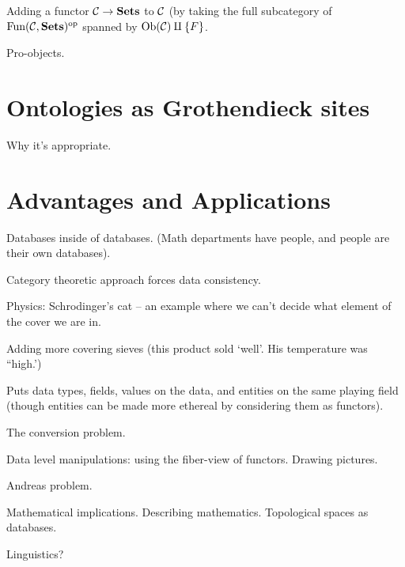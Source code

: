 \documentclass{amsart}
\begin{document}
Adding a functor $\mathcal{C}\rightarrow{\bf Sets}$ to $\mathcal{C}$ (by taking the full subcategory of $\textnormal{Fun}(\mathcal{C},{\bf Sets})^\textnormal{op}$ spanned by $\textnormal{Ob}(\mathcal{C})\amalg \{F\}$. 

Pro-objects.

\section{Ontologies as Grothendieck sites}

Why it's appropriate.  

\section{Advantages and Applications}

Databases inside of databases.  (Math departments have people, and people are their own databases).

Category theoretic approach forces data consistency.

Physics: Schrodinger's cat -- an example where we can't decide what element of the cover we are in.

Adding more covering sieves (this product sold `well'.  His temperature was ``high.')

Puts data types, fields, values on the data, and entities on the same playing field (though entities can be made more ethereal by considering them as functors).

The conversion problem.

Data level manipulations: using the fiber-view of functors.  Drawing pictures.

Andreas problem.

Mathematical implications.  Describing mathematics.  Topological spaces as databases.

Linguistics? 
\end{document}
